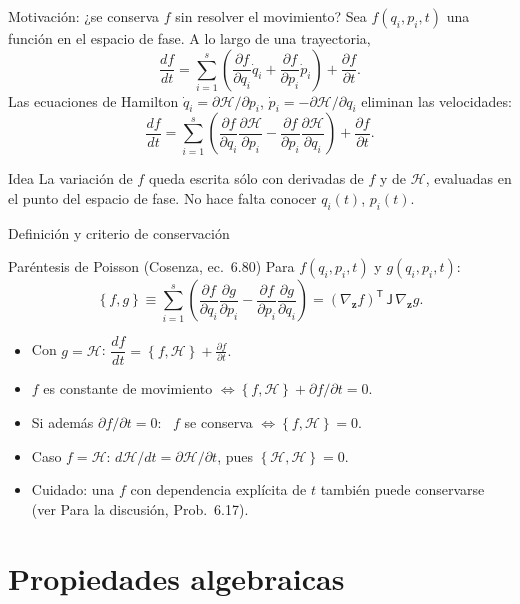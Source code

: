 \documentclass[spanish]{beamer}
\newcommand{\Ham}{\mathcal{H}}
\newcommand{\pd}[2]{\frac{\partial #1}{\partial #2}}
\newcommand{\pb}[2]{\left\{#1,#2\right\}}   %
\newcommand{\J}{\mathsf{J}}                  %
\begin{document}
\begin{frame}{Motivación: ¿se conserva $f$ sin resolver el movimiento?}
Sea $f(q_i,p_i,t)$ una función en el espacio de fase. A lo largo de una trayectoria,
\[
  \frac{df}{dt} = \sum_{i=1}^{s}\left( \pd{f}{q_i}\dot q_i + \pd{f}{p_i}\dot p_i \right)
                + \pd{f}{t} .
\]
\pause
Las ecuaciones de Hamilton $\dot q_i = \partial\Ham/\partial p_i$,
$\dot p_i = -\partial\Ham/\partial q_i$ eliminan las velocidades:
\[
  \frac{df}{dt} = \sum_{i=1}^{s}\left( \pd{f}{q_i}\pd{\Ham}{p_i}
                - \pd{f}{p_i}\pd{\Ham}{q_i} \right) + \pd{f}{t} .
\]
\pause
\begin{block}{Idea}
La variación de $f$ queda escrita sólo con derivadas de $f$ y de $\Ham$, evaluadas
en el punto del espacio de fase. No hace falta conocer $q_i(t)$, $p_i(t)$.
\end{block}
\end{frame}

\begin{frame}{Definición y criterio de conservación}
\begin{block}{Paréntesis de Poisson (Cosenza, ec.~6.80)}
Para $f(q_i,p_i,t)$ y $g(q_i,p_i,t)$:
\[
  \pb{f}{g} \equiv \sum_{i=1}^{s}\left( \pd{f}{q_i}\pd{g}{p_i}
              - \pd{f}{p_i}\pd{g}{q_i} \right)
            = (\nabla_{\mathbf z} f)^{\mathsf T}\,\J\,\nabla_{\mathbf z} g .
\]
\end{block}
\begin{itemize}
  \item<2-> Con $g=\Ham$:
  \(
    \dfrac{df}{dt} = \pb{f}{\Ham} + \pd{f}{t}.
  \)
  \item<3-> $f$ es constante de movimiento $\iff \pb{f}{\Ham} + \partial f/\partial t = 0$.
  \item<4-> Si además $\partial f/\partial t = 0$: \ $f$ se conserva $\iff \pb{f}{\Ham}=0$.
  \item<5-> Caso $f=\Ham$: $d\Ham/dt = \partial\Ham/\partial t$, pues
        $\pb{\Ham}{\Ham}=0$.
  \item<6-> \alert{Cuidado:} una $f$ con dependencia explícita de $t$ también puede
        conservarse (ver Para la discusión, Prob.~6.17).
\end{itemize}
\end{frame}

\section{Propiedades algebraicas}
\end{document}
